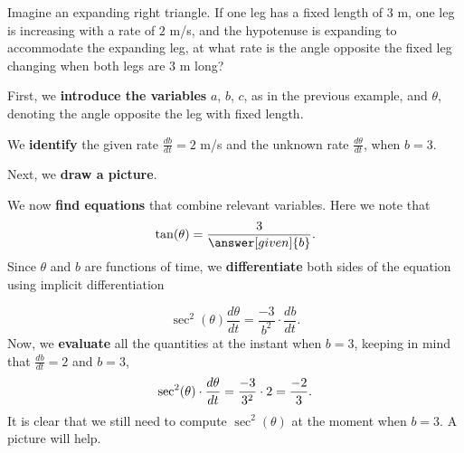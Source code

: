 \documentclass{ximera}
\begin{document}
\begin{example}
  Imagine an expanding right triangle. If one leg has a fixed length
  of $3$ m, one leg is increasing with a rate of $2$ m/s, and the
  hypotenuse is expanding to accommodate the expanding leg, at what
  rate is the angle opposite the fixed leg changing when both legs
  are $3$ m long?
  \begin{explanation}
  First, we \textbf{introduce the variables}  $a$, $b$, $c$, as in the previous example, and $\theta$, denoting
  the angle opposite the leg with fixed length. 
  
  
  We \textbf{identify} the given rate $\frac{db}{dt}=2$ m/s and the unknown rate $\frac{d\theta}{dt}$, when $b=3$.
  
  
    Next, we \textbf{draw a picture}.
     \begin{image}
    \end{image}

 
    We now \textbf{find equations} that combine relevant
    variables. Here we note that
    \[
    \tan(\theta) = \frac{3}{\answer[given]{b}}.
    \]
    Since $\theta$ and $b$ are functions of time, we
      \textbf{differentiate}  both sides of  the equation using
    implicit differentiation

    \[
    \sec^2(\theta)\frac{d\theta}{dt} = \frac{-3}{b^2}\cdot \frac{db}{dt}.
    \]
    Now, we \textbf{evaluate} all the quantities at the instant when $b=3$, keeping in mind that
    $\frac{db}{dt} = 2$ and $b = 3$,
 \[
    \sec^2(\theta)\cdot\dfrac{d\theta}{dt}= \frac{-3}{3^2}\cdot 2\\
    = \frac{-2}{3} .
 \]
    It is clear that we still need to compute $ \sec^2(\theta)$ at the moment when $b=3$. A picture will help.
     \begin{image}
\end{image}
\end{explanation}
\end{example}
\end{document}
